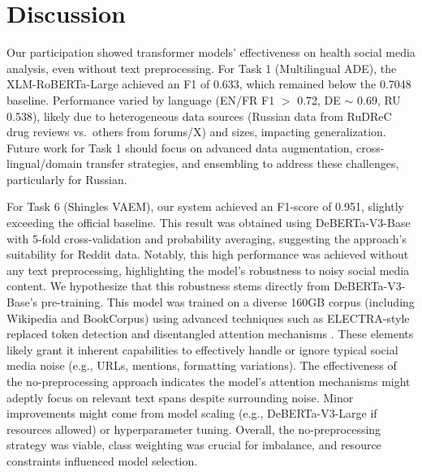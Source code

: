 \documentclass[letterpaper]{article} %
\begin{document}


\FloatBarrier
\section{Discussion}
Our participation showed transformer models' effectiveness on health social media analysis, even without text preprocessing. For Task 1 (Multilingual ADE), the XLM-RoBERTa-Large achieved an F1 of 0.633, which remained below the 0.7048 baseline.
Performance varied by language (EN/FR F1 $>$ 0.72, DE $\sim$ 0.69, RU 0.538), likely due to heterogeneous data sources (Russian data from RuDReC drug reviews vs.\ others from forums/X) and sizes, impacting generalization.
Future work for Task 1 should focus on advanced data augmentation, cross-lingual/domain transfer strategies, and ensembling to address these challenges, particularly for Russian.

For Task 6 (Shingles VAEM), our system achieved an F1-score of 0.951, slightly exceeding the official baseline. This result was obtained using DeBERTa-V3-Base with 5-fold cross-validation and probability averaging, suggesting the approach's suitability for Reddit data. Notably, this high performance was achieved without any text preprocessing, highlighting the model's robustness to noisy social media content. We hypothesize that this robustness stems directly from DeBERTa-V3-Base's pre-training. This model was trained on a diverse 160GB corpus (including Wikipedia and BookCorpus) using advanced techniques such as ELECTRA-style replaced token detection and disentangled attention mechanisms \cite{he2021debertav3}. These elements likely grant it inherent capabilities to effectively handle or ignore typical social media noise (e.g., URLs, mentions, formatting variations).
The effectiveness of the no-preprocessing approach indicates the model's attention mechanisms might adeptly focus on relevant text spans despite surrounding noise. 
Minor improvements might come from model scaling (e.g., DeBERTa-V3-Large if resources allowed) or hyperparameter tuning. Overall, the no-preprocessing strategy was viable, class weighting was crucial for imbalance, and resource constraints influenced model selection.


\end{document}
